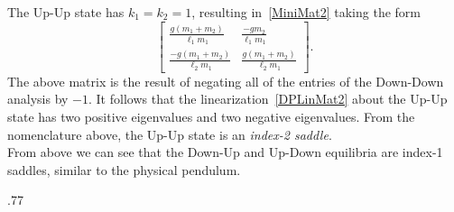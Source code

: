 \documentclass[11pt]{article}
\numberwithin{equation}{section}
\theoremstyle{plain}
\begin{document}
 The Up-Up state has $k_1 = k_2 = 1$, resulting in~\eqref{MiniMat2} taking the form
\begin{equation}
	\begin{bmatrix}
		\frac{g(m_1 + m_2)}{\ell_1m_1} & \frac{-gm_2}{\ell_1m_1} \\
		\frac{-g(m_1 + m_2)}{\ell_2m_1} & \frac{g(m_1 + m_2)}{\ell_2m_1}
	\end{bmatrix}.
\end{equation} 
The above matrix is the result of negating all of the entries of the Down-Down analysis by $-1$. It follows that the linearization~\eqref{DPLinMat2} about the Up-Up state has two positive eigenvalues and two negative eigenvalues. From the nomenclature above, the Up-Up state is an {\em index-2 saddle}. \\

\noindent From above we can see that the Down-Up and Up-Down equilibria are index-1 saddles, similar to the physical pendulum. \\




 \begin{spacing}{.77}
% 


 \end{spacing}
% 
% 
\end{document}
